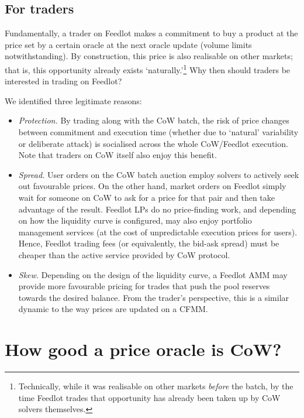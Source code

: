 \documentclass[a4paper,10pt]{article}
\theoremstyle{remark}
\begin{document}
\subsection{For traders}

Fundamentally, a trader on Feedlot makes a commitment to buy a product at the price set by a certain oracle at the next oracle update (volume limits notwithstanding).
%
By construction, this price is also realisable on other markets; that is, this opportunity already exists `naturally.'\footnote{Technically, while it was realisable on other markets \emph{before} the batch, by the time Feedlot trades that opportunity has already been taken up by CoW solvers themselves.}
%
Why then should traders be interested in trading on Feedlot?

We identified three legitimate reasons:
\begin{itemize}
  \item 
    \emph{Protection.} By trading along with the CoW batch, the risk of price changes between commitment and execution time (whether due to `natural' variability or deliberate attack) is socialised across the whole CoW/Feedlot execution.
    Note that traders on CoW itself also enjoy this benefit.
    
  \item
    \emph{Spread.} User orders on the CoW batch auction employ solvers to actively seek out favourable prices. On the other hand, market orders on Feedlot simply wait for someone on CoW to ask for a price for that pair and then take advantage of the result.
    Feedlot LPs do no price-finding work, and depending on how the liquidity curve is configured, may also enjoy portfolio management services (at the cost of unpredictable execution prices for users).
    Hence, Feedlot trading fees (or equivalently, the bid-ask spread) must be cheaper than the active service provided by CoW protocol.
    
  \item
    \emph{Skew.} Depending on the design of the liquidity curve, a Feedlot AMM may provide more favourable pricing for trades that push the pool reserves towards the desired balance.
    From the trader's perspective, this is a similar dynamic to the way prices are updated on a CFMM.

\end{itemize}

\section{How good a price oracle is CoW?}
\label{price-analysis}
\end{document}
